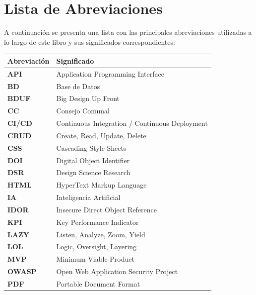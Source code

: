 \documentclass[14pt,a4paper,oneside]{extbook}
\begin{document}
\chapter*{Lista de Abreviaciones}

A continuación se presenta una lista con las principales abreviaciones utilizadas a lo largo de este libro y sus significados correspondientes:

\vspace{0.5em}

{\small
\begin{center}
\begin{tabular}{l p{10cm}}
\toprule
\textbf{Abreviación} & \textbf{Significado} \\
\midrule
\textbf{\color{primary}API} & Application Programming Interface \\
\textbf{\color{primary}BD} & Base de Datos \\
\textbf{\color{primary}BDUF} & Big Design Up Front \\
\textbf{\color{primary}CC} & Consejo Comunal \\
\textbf{\color{primary}CI/CD} & Continuous Integration / Continuous Deployment \\
\textbf{\color{primary}CRUD} & Create, Read, Update, Delete \\
\textbf{\color{primary}CSS} & Cascading Style Sheets \\
\textbf{\color{primary}DOI} & Digital Object Identifier \\
\textbf{\color{primary}DSR} & Design Science Research \\
\textbf{\color{primary}HTML} & HyperText Markup Language \\
\textbf{\color{primary}IA} & Inteligencia Artificial \\
\textbf{\color{primary}IDOR} & Insecure Direct Object Reference \\
\textbf{\color{primary}KPI} & Key Performance Indicator \\
\textbf{\color{primary}LAZY} & Listen, Analyze, Zoom, Yield \\
\textbf{\color{primary}LOL} & Logic, Oversight, Layering \\
\textbf{\color{primary}MVP} & Minimum Viable Product \\
\textbf{\color{primary}OWASP} & Open Web Application Security Project \\
\textbf{\color{primary}PDF} & Portable Document Format \\

\end{tabular}
\end{center}}
\end{document}
